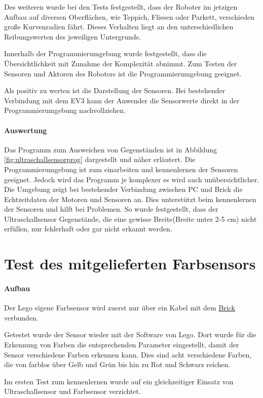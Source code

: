 Des weiteren wurde bei den Tests festgestellt, dass der Roboter im jetzigen Aufbau auf diversen Oberflächen, wie Teppich, Fliesen oder Parkett, verschieden große Kurvenradien fährt. Dieses Verhalten liegt an den unterschiedlichen Reibungswerten des jeweiligen Untergrunds.

Innerhalb der Programmierumgebung wurde festgestellt, dass die Übersichtlichkeit mit Zunahme der Komplexität abnimmt. Zum Testen der Sensoren und Aktoren des Roboters ist die Programmierumgebung geeignet.

Als positiv zu werten ist die Darstellung der Sensoren. Bei bestehender Verbindung mit dem EV3 kann der Anwender die Sensorwerte direkt in der Programmierumgebung nachvollziehen.

\paragraph{Auswertung}
Das Programm zum Ausweichen von Gegenständen ist in Abbildung \vref{fig:ultraschallsensorprog} dargestellt und näher erläutert. Die Programmierumgebung ist zum einarbeiten und kennenlernen der Sensoren geeignet. Jedoch wird das Programm je komplexer es wird auch unübersichtlicher. Die Umgebung zeigt bei bestehender Verbindung zwischen PC und Brick die Echtzeitdaten der Motoren und Sensoren an. Dies unterstützt beim kennenlernen der Sensoren und hilft bei Problemen. So wurde festgestellt, dass der Ultraschallsensor Gegenstände, die eine gewisse Breite(Breite unter 2-5 cm) nicht erfüllen, nur fehlerhaft oder gar nicht erkannt werden.  

\section{Test des mitgelieferten Farbsensors}
\paragraph{Aufbau}
Der Lego eigene Farbsensor wird zuerst nur über ein Kabel mit dem \underline{Brick} verbunden. 

Getestet wurde der Sensor wieder mit der Software von Lego. Dort wurde für die Erkennung von Farben die entsprechenden Parameter eingestellt, damit der Sensor verschiedene Farben erkennen kann. Dies sind acht verschiedene Farben, die von farblos über Gelb und Grün bis hin zu Rot und Schwarz reichen.

Im ersten Test zum kennenlernen wurde auf ein gleichzeitiger Einsatz von Ultraschallsensor und Farbsensor verzichtet.

